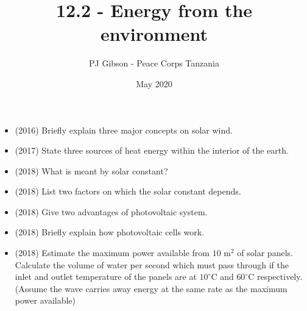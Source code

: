 \documentclass{article}
\title{\textbf{12.2 - Energy from the environment}}
\author{PJ Gibson - Peace Corps Tanzania}
\date{May 2020}
\begin{document}
\maketitle

\begin{itemize}
\item (2016)  Briefly explain three major concepts on solar wind.
\item (2017)  State three sources of heat energy within the interior of the earth. 
\item (2018)  What is meant by solar constant? 
\item (2018)  List two factors on which the solar constant depends. 
\item (2018)  Give two advantages of photovoltaic system. 
\item (2018)  Briefly explain how photovoltaic cells work. 
\item (2018)  Estimate the maximum power available from $ 10$ m$ ^{2}$ of solar panels.  Calculate the volume of water per second which must pass through if the inlet and outlet temperature of the panels are at $ 10^{\circ}$C and $ 60^{\circ}$C respectively. (Assume the wave carries away energy at the same rate as the maximum power available)
\end{itemize}
\end{document}
